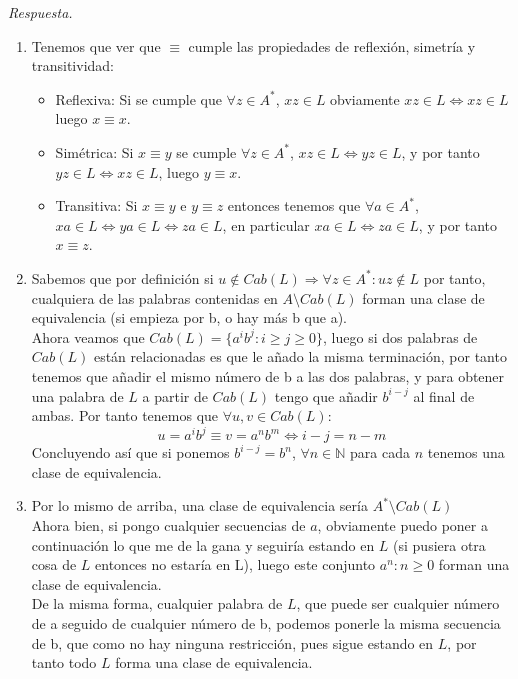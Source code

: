 \documentclass[11pt]{article}
\theoremstyle{ejercicio-style}
\begin{document}
\emph{Respuesta.}
\begin{enumerate}
	\item Tenemos que ver que $\equiv$ cumple las propiedades de reflexión, simetría y transitividad:
	\begin{itemize}
		\item Reflexiva: Si se cumple que $\forall z \in A^*$, $xz \in L$ obviamente $xz \in L \iff xz \in L$ luego $x \equiv x$.
		\item Simétrica: Si $x \equiv y$ se cumple $\forall z \in A^*$, $xz \in L \iff yz \in L$, y por tanto $yz \in L \iff xz \in L$, luego $y \equiv x$.
		\item Transitiva: Si $x \equiv y$ e $y \equiv z$ entonces tenemos que $\forall a \in A^*$, $xa \in L \iff ya \in L \iff za \in L$, en particular $xa \in L \iff za \in L$, y por tanto $ x \equiv z$. 
	\end{itemize}
	\item Sabemos que por definición si $u \notin Cab(L) \Rightarrow \forall z \in A^* : uz \notin L$ por tanto, cualquiera de las palabras contenidas en $A \setminus Cab(L)$ forman una clase de equivalencia (si empieza por b, o hay más b que a). \\
	
	Ahora veamos que $Cab(L) = \{ a^ib^j : i \geq j \geq 0 \} $, luego si dos palabras de $Cab(L)$ están relacionadas es que le añado la misma terminación, por tanto tenemos que añadir el mismo número de b a las dos palabras, y para obtener una palabra de $L$ a partir de $Cab(L)$ tengo que añadir $b^{i-j}$ al final de ambas. Por tanto tenemos que $\forall u,v \in Cab(L)$:
	$$ u = a^ib^j \equiv v = a^nb^m \iff i-j = n-m$$
Concluyendo así que si ponemos $b^{i-j} = b^n$, $\forall n \in \mathbb{N}$ para cada $n$ tenemos una clase de equivalencia.
	\item Por lo mismo de arriba, una clase de equivalencia sería $A^* \setminus Cab(L)$ \\
	Ahora bien, si pongo cualquier secuencias de $a$, obviamente puedo poner a continuación lo que me de la gana y seguiría estando en $L$ (si pusiera otra cosa de $L$ entonces no estaría en L), luego este conjunto ${a^n: n \geq 0}$ forman una clase de equivalencia. \\
	
	De la misma forma, cualquier palabra de $L$, que puede ser cualquier número de a seguido de cualquier número de b, podemos ponerle la misma secuencia de b, que como no hay ninguna restricción, pues sigue estando en $L$, por tanto todo $L$ forma una clase de equivalencia. \\
	

\end{enumerate}
\end{document}
